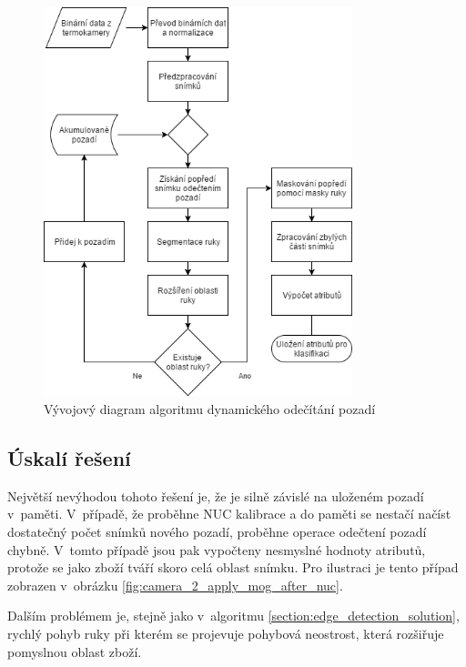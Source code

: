 \begin{figure}[h]
  \centering
  \includegraphics[width=0.8\textwidth]{images/mog_detection_diagram.png}
  \caption{Vývojový diagram algoritmu dynamického odečítání pozadí}
  \label{fig:mog_detection_diagram}
\end{figure} 

	\subsection{Úskalí řešení} \label{section:background_substract_problems}
    Největší nevýhodou tohoto řešení je, že je silně závislé na uloženém pozadí v~paměti. V~případě, že proběhne NUC kalibrace a do paměti se nestačí načíst dostatečný počet snímků nového pozadí, proběhne operace odečtení pozadí chybně. V~tomto případě jsou pak vypočteny nesmyslné hodnoty atributů, protože se jako zboží  tváří skoro celá oblast snímku. Pro ilustraci je tento případ zobrazen v~obrázku \ref{fig:camera_2_apply_mog_after_nuc}.
    
    Dalším problémem je, stejně jako v~algoritmu \ref{section:edge_detection_solution}, rychlý pohyb ruky při kterém se projevuje pohybová neostrost, která rozšiřuje pomyslnou oblast zboží.
    
